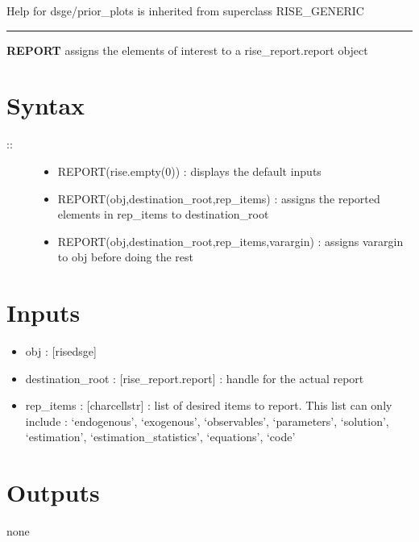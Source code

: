 \documentclass[letterpaper,10pt,english]{sphinxmanual}
\begin{document}
Help for dsge/prior\_plots is inherited from superclass RISE\_GENERIC


\bigskip\hrule{}\bigskip

\label{classes/models/@dsge/dsge:report}
\textbf{REPORT} assigns the elements of interest to a rise\_report.report object


\section{Syntax}
\label{classes/models/@dsge/dsge:id140}\begin{description}
\item[{::}] \leavevmode\begin{itemize}
\item {} 
REPORT(rise.empty(0)) : displays the default inputs

\item {} 
REPORT(obj,destination\_root,rep\_items) : assigns the reported
elements in rep\_items to destination\_root

\item {} 
REPORT(obj,destination\_root,rep\_items,varargin) : assigns varargin to
obj before doing the rest

\end{itemize}

\end{description}


\section{Inputs}
\label{classes/models/@dsge/dsge:id141}\begin{itemize}
\item {} 
obj : {[}rise\textbar{}dsge{]}

\item {} 
destination\_root : {[}rise\_report.report{]} : handle for the actual report

\item {} 
rep\_items : {[}char\textbar{}cellstr{]} : list of desired items to report. This list
can only include : `endogenous', `exogenous', `observables',
`parameters', `solution', `estimation', `estimation\_statistics',
`equations', `code'

\end{itemize}


\section{Outputs}
\label{classes/models/@dsge/dsge:id142}
none
\end{document}

